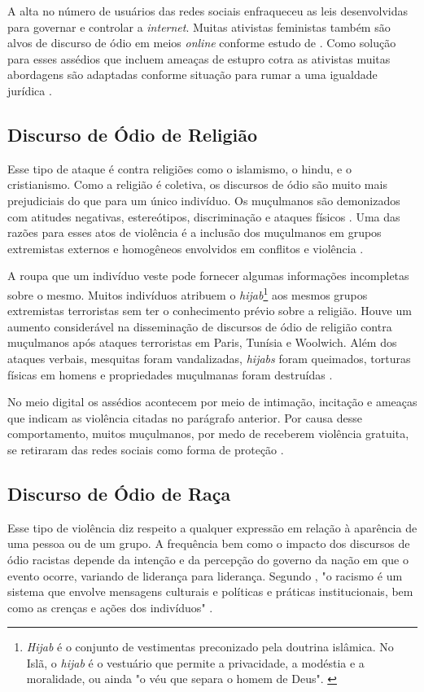 A alta no número de usuários das redes sociais enfraqueceu as leis desenvolvidas para governar e controlar a \textit{internet}. Muitas ativistas feministas também são alvos de discurso de ódio em meios \textit{online} conforme estudo de 
. Como solução para esses assédios que incluem ameaças de estupro cotra as ativistas muitas abordagens são adaptadas conforme situação para rumar a uma igualdade jurídica \cite{Levy2017}. 

\subsection{Discurso de Ódio de Religião}
Esse tipo de ataque é contra religiões como o islamismo, o hindu, e o cristianismo. Como a religião é coletiva, os discursos de ódio são muito mais prejudiciais do que para um único indivíduo. Os muçulmanos são demonizados com atitudes negativas, estereótipos, discriminação e ataques físicos \cite{Chetty2018}. Uma das razões para esses atos de violência é a inclusão dos muçulmanos em grupos extremistas externos e homogêneos envolvidos em conflitos e violência \cite{Trnberg2016}.  

A roupa que um indivíduo veste pode fornecer algumas informações incompletas sobre o mesmo. Muitos indivíduos atribuem o \textit{hijab}\footnote{\textit{Hijab} é o conjunto de vestimentas preconizado pela doutrina islâmica. No Islã, o \textit{hijab} é o vestuário que permite a privacidade, a modéstia e a moralidade, ou ainda "o véu que separa o homem de Deus". \cite{9780742562967}} aos mesmos grupos extremistas terroristas sem ter o conhecimento prévio sobre a religião. Houve um aumento considerável na disseminação de discursos de ódio de religião contra muçulmanos após ataques terroristas em Paris, Tunísia e Woolwich. Além dos ataques verbais, mesquitas foram vandalizadas, \textit{hijabs} foram queimados, torturas físicas em homens e propriedades muçulmanas foram destruídas \cite{Awan2016,Chetty2018}.

No meio digital os assédios acontecem por meio de intimação, incitação e ameaças que indicam as violência citadas no parágrafo anterior. Por causa desse comportamento, muitos muçulmanos, por medo de receberem violência gratuita, se retiraram das redes sociais como forma de proteção \cite{Chetty2018}.

\subsection{Discurso de Ódio de Raça}
Esse tipo de violência diz respeito a qualquer expressão em relação à aparência de uma pessoa ou de um grupo. A frequência bem como o impacto dos discursos de ódio racistas depende da intenção e da percepção do governo da nação em que o evento ocorre, variando de liderança para liderança. Segundo , "o racismo é um sistema que envolve mensagens culturais e políticas e práticas institucionais, bem como as crenças e ações dos indivíduos" \cite{tatum2001defining}.

